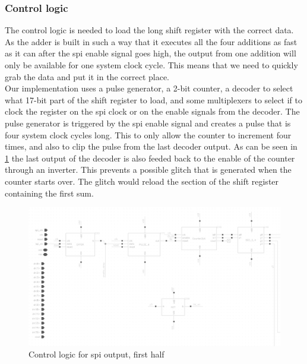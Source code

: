 \subsubsection{Control logic}
The control logic is needed to load the long shift register with the correct data. \\
As the adder is built in such a way that it executes all the four additions as fast as it can after the spi enable signal goes high, the output from one addition will only be available for one system clock cycle. This means that we need to quickly grab the data and put it in the correct place.\\ 
Our implementation uses a pulse generator, a 2-bit counter, a decoder to select what 17-bit part of the shift register to load, and some multiplexers to select if to clock the register on the spi clock or on the enable signals from the decoder. The pulse generator is triggered by the spi enable signal and creates a pulse that is four system clock cycles long. This to only allow the counter to increment four times, and also to clip the pulse from the last decoder output. As can be seen in \ref{spi_out1} the last output of the decoder is also feeded back to the enable of the counter through an inverter. This prevents a possible glitch that is generated when the counter starts over. The glitch would reload the section of the shift register containing the first sum. \\

\begin{figure}[H]
\centering
\captionsetup{justification=centering}
\includegraphics[scale=0.18]{../figures/spi_out1.png}
\caption{Control logic for spi output, first half}
\label{spi_out1}
\end{figure}


